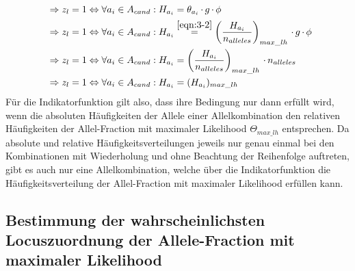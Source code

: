 \begin{center}
{{\begin{beweis}
\begin{equation}
\begin{aligned}
				&\ \Rightarrow z_{l} = 1 \Leftrightarrow \forall a_{i} \in A_{cand} : H_{a_{i}} = \theta_{a_{i}} \, \cdotp g \, \cdotp \phi \\
				&\ \Rightarrow z_{l} = 1 \Leftrightarrow \forall a_{i} \in A_{cand} : H_{a_{i}} \stackrel{\ref{eqn:3-2}}{=}  \left( \frac{H_{a_{i}}}{n_{alleles}}\right)_{max\_lh}  \, \cdotp g \, \cdotp \phi \\
				&\ \Rightarrow z_{l} = 1 \Leftrightarrow \forall a_{i} \in A_{cand} : H_{a_{i}} = \left( \frac{H_{a_{i}}}{n_{alleles}}\right)_{max\_lh}  \, \cdotp n_{alleles} \\
				&\ \Rightarrow z_{l} = 1 \Leftrightarrow \forall a_{i} \in A_{cand} : H_{a_{i}} = (H_{a_{i}})_{max\_lh} \\
				\end{aligned}
				\end{equation}
				Für die Indikatorfunktion gilt also, dass ihre Bedingung nur dann erfüllt wird, wenn die absoluten Häufigkeiten der Allele einer Allelkombination den relativen Häufigkeiten der Allel-Fraction mit maximaler Likelihood $ \Theta_{max\_lh} $ entsprechen. Da absolute und relative Häufigkeitsverteilungen jeweils nur genau einmal bei den Kombinationen mit Wiederholung und ohne Beachtung der Reihenfolge auftreten, gibt es auch nur eine Allelkombination, welche über die Indikatorfunktion die Häufigkeitsverteilung der Allel-Fraction mit maximaler Likelihood erfüllen kann.
			\end{beweis}
	}}
\end{center}

\subsection{Bestimmung der wahrscheinlichsten Locuszuordnung der Allele-Fraction mit maximaler Likelihood} \label{subsec:lh_loci}

